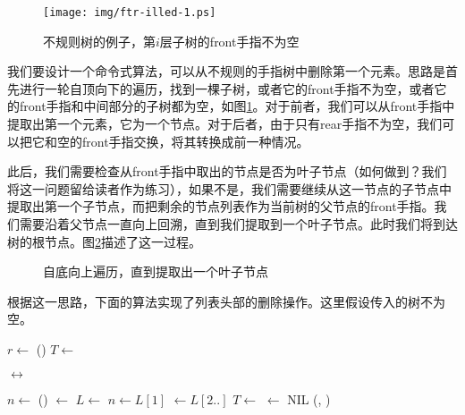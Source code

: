 \documentclass[UTF8]{article}
\begin{document}
\begin{figure}[htbp]
  \centering
  \texttt{[image: img/ftr-illed-1.ps]}
  \caption{不规则树的例子，第$i$层子树的front手指不为空} \label{fig:ftr-illed-form}
\end{figure}

我们要设计一个命令式算法，可以从不规则的手指树中删除第一个元素。思路是首先进行一轮自顶向下的遍历，找到一棵子树，或者它的front手指不为空，或者它的front手指和中间部分的子树都为空，如图\ref{fig:ftr-illed-form}。对于前者，我们可以从front手指中提取出第一个元素，它为一个节点。对于后者，由于只有rear手指不为空，我们可以把它和空的front手指交换，将其转换成前一种情况。

此后，我们需要检查从front手指中取出的节点是否为叶子节点（如何做到？我们将这一问题留给读者作为练习），如果不是，我们需要继续从这一节点的子节点中提取出第一个子节点，而把剩余的节点列表作为当前树的父节点的front手指。我们需要沿着父节点一直向上回溯，直到我们提取到一个叶子节点。此时我们将到达树的根节点。图\ref{fig:ftr-illed-extract}描述了这一过程。

\begin{figure}[htbp]
  \centering
  \caption{自底向上遍历，直到提取出一个叶子节点} \label{fig:ftr-illed-extract}
\end{figure}

根据这一思路，下面的算法实现了列表头部的删除操作。这里假设传入的树不为空。

\begin{algorithmic}
  \State $r \gets$ ()
  \State {}
    \State $T \gets$ 
  \EndWhile

    \State {}  $\leftrightarrow$ 
  \EndIf

  \State $n \gets $ ()
  \State {} $\gets$ 
  \Repeat
    \State $L \gets$  
    \State $n \gets L[1]$ 
    \State {} $\gets L[2..]$ 
    \State $T \gets $ 
      \State {} $\gets$ NIL
    \EndIf
  \State \Return (, )
\EndFunction
\end{algorithmic}
\end{document}
